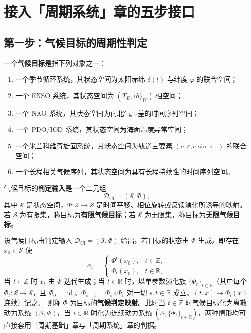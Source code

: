 \section{接入「周期系统」章的五步接口}
\label{sec:climate_five_steps}

\subsection{第一步：气候目标的周期性判定}

\begin{definition}[气候目标与判定输入]\label{def:climate_target}
一个\textbf{气候目标}是指下列对象之一：
\begin{enumerate}[label=(\roman*)]
    \item 一个季节循环系统，其状态空间为太阳赤纬 $\delta(t)$ 与纬度 $\varphi$ 的联合空间；
    \item 一个 ENSO 系统，其状态空间为 $(T_E,\langle h\rangle_W)$ 相空间；
    \item 一个 NAO 系统，其状态空间为南北气压差的时间序列空间；
    \item 一个 PDO/IOD 系统，其状态空间为海面温度异常空间；
    \item 一个米兰科维奇旋回系统，其状态空间为轨道三要素 $(e,\varepsilon,e\sin\varpi)$ 的联合空间；
    \item 一个长程相关气候序列，其状态空间为具有长程持续性的时间序列空间。
\end{enumerate}
气候目标的\textbf{判定输入}是一个二元组
\[
\mathcal D_{\mathrm{Cl}}=(\mathcal S,\Phi),
\]
其中 $\mathcal S$ 是状态空间，$\Phi:\mathcal S\to\mathcal S$ 是时间平移、相位旋转或反馈演化所诱导的映射。若 $\mathcal S$ 为有限集，称目标为\textbf{有限气候目标}；若 $\mathcal S$ 为无限集，称目标为\textbf{无限气候目标}。
\end{definition}

\begin{definition}[气候判定映射]\label{def:climate_periodization}
设气候目标由判定输入 $\mathcal D_{\mathrm{Cl}}=(\mathcal S,\Phi)$ 给出。若目标的状态由 $\Phi$ 生成，即存在 $x_0\in\mathcal S$ 使
\[
x_t=\begin{cases}\Phi^t(x_0), & t\in\mathbb Z,\\ \Phi_t(x_0), & t\in\mathbb R,\end{cases}
\]
当 $t\in\mathbb Z$ 时 $x_t$ 由 $\Phi$ 迭代生成；当 $t\in\mathbb R$ 时，以单参数演化族 $\{\Phi_t\}_{t\in\mathbb R}$（其中每个 $\Phi_t:\mathcal S\to\mathcal S$，且 $\Phi_0=\operatorname{id}$、$\Phi_{s+t}=\Phi_s\circ\Phi_t$ 对一切 $s,t\in\mathbb R$ 成立、$(t,x)\mapsto\Phi_t(x)$ 连续）记之。
则称 $\Phi$ 为目标的\textbf{气候判定映射}。此时当 $t\in\mathbb Z$ 时气候目标化为离散动力系统 $(\mathcal S,\Phi)$，当 $t\in\mathbb R$ 时化为连续动力系统 $(\mathcal S,\{\Phi_t\}_{t\in\mathbb R})$，两种情形均可直接套用「周期基础」章与「周期系统」章的判据。
\end{definition}

